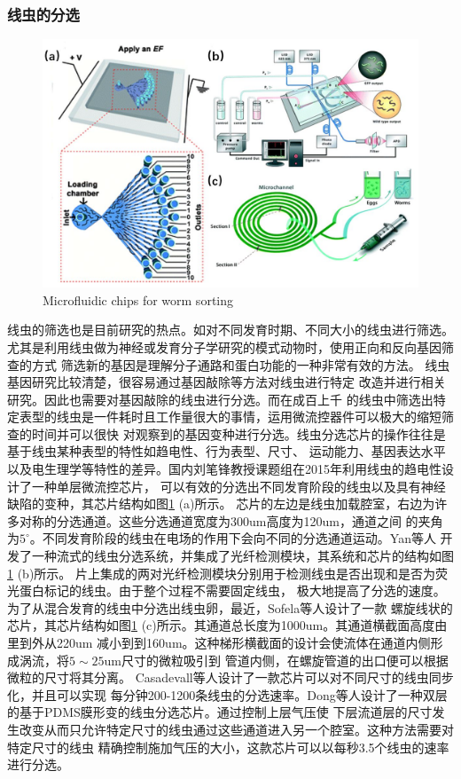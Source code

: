 \subsubsection{线虫的分选}
\label{sec:intro:analog}
	\begin{figure}[t]
	  \centering
	  \includegraphics[width=12cm]{figure/chap1/sorting.jpg}
		{Microfluidic chips for worm sorting}
	  \label{fig:sorting}
	\end{figure}
	线虫的筛选也是目前研究的热点。如对不同发育时期、不同大小的线虫进行筛选。
	尤其是利用线虫做为神经或发育分子学研究的模式动物时，使用正向和反向基因筛查的方式
	筛选新的基因是理解分子通路和蛋白功能的一种非常有效的方法。
	线虫基因研究比较清楚，很容易通过基因敲除等方法对线虫进行特定
	改造并进行相关研究。因此也需要对基因敲除的线虫进行分选。而在成百上千
	的线虫中筛选出特定表型的线虫是一件耗时且工作量很大的事情，运用微流控器件可以极大的缩短筛查的时间并可以很快
	对观察到的基因变种进行分选。线虫分选芯片的操作往往是基于线虫某种表型的特性如趋电性、行为表型、尺寸、
	运动能力、基因表达水平以及电生理学等特性的差异。国内刘笔锋教授课题组在2015年利用线虫的趋电性设计了一种单层微流控芯片\cite{C5LC00354G}，
	可以有效的分选出不同发育阶段的线虫以及具有神经缺陷的变种，其芯片结构如图\ref{fig:sorting} (a)所示。
	芯片的左边是线虫加载腔室，右边为许多对称的分选通道。这些分选通道宽度为300um高度为120um，通道之间
	的夹角为$5^\circ$。不同发育阶段的线虫在电场的作用下会向不同的分选通道运动。Yan等人\cite{yan2014continuous}
	开发了一种流式的线虫分选系统，并集成了光纤检测模块，其系统和芯片的结构如图\ref{fig:sorting} (b)所示。
	片上集成的两对光纤检测模块分别用于检测线虫是否出现和是否为荧光蛋白标记的线虫。由于整个过程不需要固定线虫，
	极大地提高了分选的速度。为了从混合发育的线虫中分选出线虫卵，最近，Sofela等人\cite{sofela2018high}设计了一款
	螺旋线状的芯片，其芯片结构如图\ref{fig:sorting} (c)所示。其通道总长度为1000um。其通道横截面高度由里到外从220um
	减小到到160um。这种梯形横截面的设计会使流体在通道内侧形成涡流，将$5\sim25$um尺寸的微粒吸引到
	管道内侧，在螺旋管道的出口便可以根据微粒的尺寸将其分离。
	Casadevall\cite{Casadevall2011High}等人设计了一款芯片可以对不同尺寸的线虫同步化，并且可以实现
	每分钟200-1200条线虫的分选速率。Dong\cite{dong2016versatile}等人设计了一种双层的基于PDMS膜形变的线虫分选芯片。通过控制上层气压使
	下层流道层的尺寸发生改变从而只允许特定尺寸的线虫通过这些通道进入另一个腔室。这种方法需要对特定尺寸的线虫
	精确控制施加气压的大小，这款芯片可以以每秒3.5个线虫的速率进行分选。


